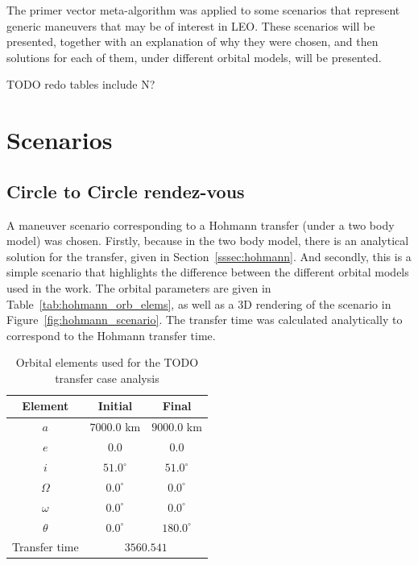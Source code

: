 
The primer vector meta-algorithm was applied to some scenarios that represent generic maneuvers that may be of interest in LEO\@. These scenarios will be presented, together with an explanation of why they were chosen, and then solutions for each of them, under different orbital models, will be presented.

TODO redo tables include N?


\section{Scenarios}

\subsection{Circle to Circle rendez-vous}

A maneuver scenario corresponding to a Hohmann transfer (under a two body model) was chosen. Firstly, because in the two body model, there is an analytical solution for the transfer, given in Section~\ref{sssec:hohmann}. And secondly, this is a simple scenario that highlights the difference between the different orbital models used in the work. The orbital parameters are given in Table~\ref{tab:hohmann_orb_elems}, as well as a 3D rendering of the scenario in Figure~\ref{fig:hohmann_scenario}. The transfer time was calculated analytically to correspond to the Hohmann transfer time.

\begin{table}[htbp]
    \centering
    \begin{tabular}{ccc} \toprule
        Element & Initial & Final \\ \midrule
        \(a\)      & \(7000.0\) km         & \(9000.0\) km   \\
        \(e\)      & \(0.0\)            & \(0.0\)        \\
        \(i\)      & \(51.0^\circ\)      & \(51.0^\circ\) \\
        \(\Omega\) & \(0.0^\circ\)   & \(0.0^\circ\)  \\
        \(\omega\) & \(0.0^\circ\)  & \(0.0^\circ\)  \\
        \(\theta\) & \(0.0^\circ\)  & \(180.0^\circ\)  \\ 
        Transfer time & \multicolumn{2}{c}{\(3560.541\)} \\\bottomrule
    \end{tabular}
    \caption{Orbital elements used for the TODO transfer case analysis}
    \label{tab:TODO_orb_elems}
\end{table}


